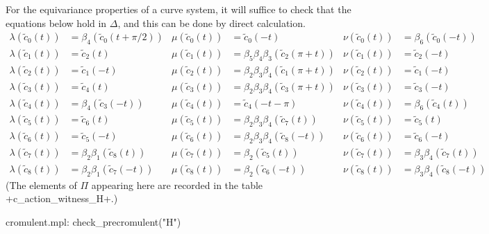 \documentclass[reqno]{amsart}
\newcommand{\Dl}        {\Delta}
\newcommand{\bt}        {\beta}
\newcommand{\lm}        {\lambda}
\newcommand{\tc}	{\widetilde{c}}
\renewcommand{\:}{\colon}
\theoremstyle{definition}
\begin{document}
For the equivariance properties of a curve system, it will suffice to check that
the equations below hold in $\Dl$, and this can be done by direct calculation.
\begin{align*}
 \lm(\tc_0(t)) &= \bt_4(\tc_0(t+\pi/2)) &
 \mu(\tc_0(t)) &= \tc_0(-t) &
 \nu(\tc_0(t)) &= \bt_6(\tc_0(-t)) \\
 \lm(\tc_1(t)) &= \tc_2(t) &
 \mu(\tc_1(t)) &= \bt_5\bt_4\bt_3(\tc_2(\pi+t)) &
 \nu(\tc_1(t)) &= \tc_2(-t) \\
 \lm(\tc_2(t)) &= \tc_1(-t) &
 \mu(\tc_2(t)) &= \bt_2\bt_3\bt_4(\tc_1(\pi+t)) &
 \nu(\tc_2(t)) &= \tc_1(-t) \\
 \lm(\tc_3(t)) &= \tc_4(t) &
 \mu(\tc_3(t)) &= \bt_2\bt_3\bt_4(\tc_3(\pi+t)) &
 \nu(\tc_3(t)) &= \tc_3(-t) \\
 \lm(\tc_4(t)) &= \bt_4(\tc_3(-t)) &
 \mu(\tc_4(t)) &= \tc_4(-t-\pi) &
 \nu(\tc_4(t)) &= \bt_6(\tc_4(t)) \\
 \lm(\tc_5(t)) &= \tc_6(t) &
 \mu(\tc_5(t)) &= \bt_2\bt_3\bt_4(\tc_7(t)) &
 \nu(\tc_5(t)) &= \tc_5(t) \\
 \lm(\tc_6(t)) &= \tc_5(-t) &
 \mu(\tc_6(t)) &= \bt_2\bt_3\bt_4(\tc_8(-t)) &
 \nu(\tc_6(t)) &= \tc_6(-t) \\
 \lm(\tc_7(t)) &= \bt_2\bt_1(\tc_8(t)) &
 \mu(\tc_7(t)) &= \bt_2(\tc_5(t)) &
 \nu(\tc_7(t)) &= \bt_3\bt_4(\tc_7(t)) \\
 \lm(\tc_8(t)) &= \bt_2\bt_1(\tc_7(-t)) &
 \mu(\tc_8(t)) &= \bt_2(\tc_6(-t)) &
 \nu(\tc_8(t)) &= \bt_3\bt_4(\tc_8(-t))
\end{align*}
(The elements of $\Pi$ appearing here are recorded in the table
\mcode+c_action_witness_H+.)
\begin{checks}
 cromulent.mpl: check_precromulent("H")
\end{checks}
\end{document}
